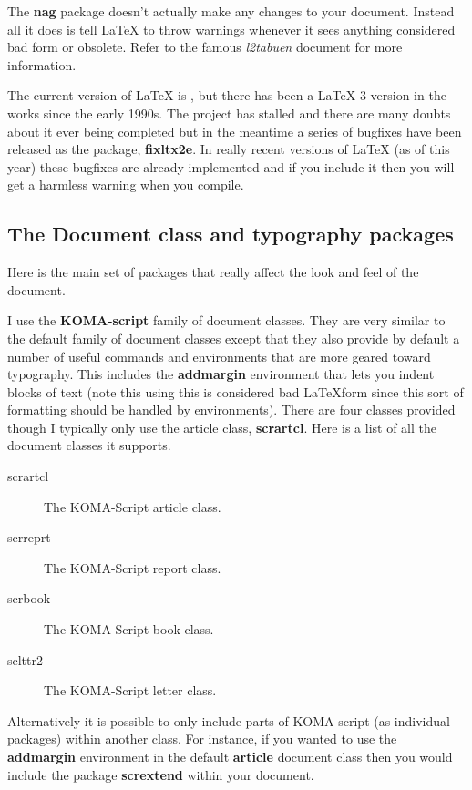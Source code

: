       The \textbf{nag} package doesn't actually make any changes to your document. Instead all it does is tell \LaTeX{} to throw warnings whenever it sees anything considered bad form or obsolete. Refer to the famous \textit{l2tabuen} document for more information.

      The current version of \LaTeX{} is \LaTeXe, but there has been a \LaTeX{} 3 version in the works since the early 1990s. The project has stalled and there are many doubts about it ever being completed but in the meantime a series of bugfixes have been released as the package, \textbf{fixltx2e}. In really recent versions of \LaTeX{} (as of this year) these bugfixes are already implemented and if you include it then you will get a harmless warning when you compile.

    \subsection{The Document class and typography packages}
      Here is the main set of packages that really affect the look and feel of the document.

      I use the \textbf{KOMA-script} family of document classes. They are very similar to the default family of document classes except that they also provide by default a number of useful commands and environments that are more geared toward typography. This includes the \textbf{addmargin} environment that lets you indent blocks of text (note this using this is considered bad \LaTeX form since this sort of formatting should be handled by environments). There are four classes provided though I typically only use the article class, \textbf{scrartcl}. Here is a list of all the document classes it supports.

      \begin{addmargin}{1cm}
        \begin{description}
          \item[scrartcl] The KOMA-Script article class.
          \item[scrreprt] The KOMA-Script report class.
          \item[scrbook] The KOMA-Script book class.
          \item[sclttr2] The KOMA-Script letter class.
        \end{description} 
      \end{addmargin}

      Alternatively it is possible to only include parts of KOMA-script (as individual packages) within another class. For instance, if you wanted to use the \textbf{addmargin} environment in the default \textbf{article} document class then you would include the package \textbf{scrextend} within your document.

